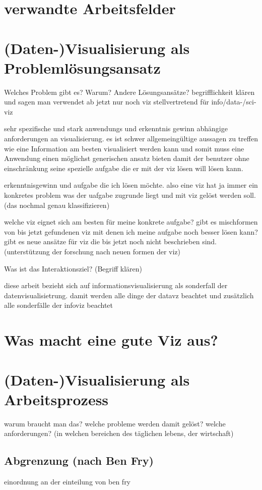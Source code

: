 \documentclass[a4paper, 12pt, onepage, pdftex, headsepline, footsepline]{scrreprt}
\begin{document}
\section{verwandte Arbeitsfelder}
\section{(Daten-)Visualisierung als Problemlösungsansatz}
Welches Problem gibt es?
Warum?
Andere Lösungsansätze?
begrifflichkeit klären und sagen man verwendet ab jetzt nur noch viz stellvertretend für info/data-/sci-viz

sehr spezifische und stark anwendungs und erkenntnis gewinn abhängige anforderungen an visualisierung. 
es ist schwer allgemeingültige aussagen zu treffen wie eine Information am besten visualisiert werden kann und somit muss eine Anwendung einen möglichst generischen ansatz bieten damit der benutzer ohne einschränkung seine spezielle aufgabe die er mit der viz lösen will lösen kann.

erkenntnisgewinn und aufgabe die ich lösen möchte. also eine viz hat ja immer ein konkretes problem was der uafgabe zugrunde liegt und mit viz gelöst werden soll. (das nochmal genau klassifizieren)

welche viz eignet sich am besten für meine konkrete aufgabe?
gibt es mischformen von bis jetzt gefundenen viz mit denen ich meine aufgabe noch besser lösen kann?
gibt es neue ansätze für viz die bis jetzt noch nicht beschrieben sind. (unterstützung der forschung nach neuen formen der viz)

Was ist das Interaktionsziel? (Begriff klären)

diese arbeit bezieht sich auf informationsvisualisierung als sonderfall der datenvisualisietrung. damit werden alle dinge der datavz beachtet und zusätzlich alle sonderfälle der infoviz beachtet

\section{Was macht eine gute Viz aus?}
\section{(Daten-)Visualisierung als Arbeitsprozess}
warum braucht man das? welche probleme werden damit gelöst?
welche anforderungen? (in welchen bereichen des täglichen lebens, der wirtschaft)
\subsection{Abgrenzung (nach Ben Fry)}
einordnung an der einteilung von ben fry
\end{document}
